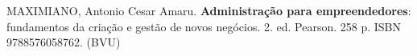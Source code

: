 \begin{pud}
\begin{bibcomplementar}
         \item MAXIMIANO, Antonio Cesar Amaru. \textbf{Administração para empreendedores}: fundamentos da criação e gestão de novos negócios. 2. ed. Pearson.  258 p. ISBN 9788576058762.  (BVU) %

	\end{bibcomplementar}
	
		
\end{pud}


